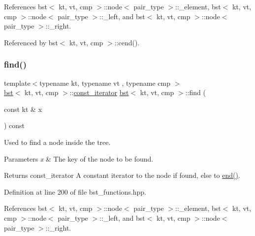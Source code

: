 References bst$<$ kt, vt, cmp $>$\+::node$<$ pair\+\_\+type $>$\+::\+\_\+element, bst$<$ kt, vt, cmp $>$\+::node$<$ pair\+\_\+type $>$\+::\+\_\+left, and bst$<$ kt, vt, cmp $>$\+::node$<$ pair\+\_\+type $>$\+::\+\_\+right.



Referenced by bst$<$ kt, vt, cmp $>$\+::cend().

\mbox{\label{classbst_a2971e3ad8b28cf5bdf08128eee48d26d}} 
\subsubsection{\texorpdfstring{find()}{find()}\hspace{0.1cm}{\footnotesize\ttfamily [2/2]}}
{\footnotesize\ttfamily template$<$typename kt, typename vt , typename cmp $>$ \\
\hyperlink{classbst}{bst}$<$ kt, vt, cmp $>$\+::\hyperlink{classbst_a72485696d999bf489c6156f6327a2163}{const\+\_\+iterator} \hyperlink{classbst}{bst}$<$ kt, vt, cmp $>$\+::find (\begin{DoxyParamCaption}\item[{const kt \&}]{x }\end{DoxyParamCaption}) const\hspace{0.3cm}{\ttfamily [noexcept]}}



Used to find a node inside the tree. 


\begin{DoxyParams}{Parameters}
{\em x} & The key of the node to be found. \\
\hline
\end{DoxyParams}
\begin{DoxyReturn}{Returns}
const\+\_\+iterator A constant iterator to the node if found, else to \hyperlink{classbst_aed3a831efc810b5084cb0c9f4adeb16a}{end()}. 
\end{DoxyReturn}


Definition at line 200 of file bst\+\_\+functions.\+hpp.



References bst$<$ kt, vt, cmp $>$\+::node$<$ pair\+\_\+type $>$\+::\+\_\+element, bst$<$ kt, vt, cmp $>$\+::node$<$ pair\+\_\+type $>$\+::\+\_\+left, and bst$<$ kt, vt, cmp $>$\+::node$<$ pair\+\_\+type $>$\+::\+\_\+right.

\mbox{\label{classbst_aaaeffdb4fae1103a3f6185c74ce43281}} 
